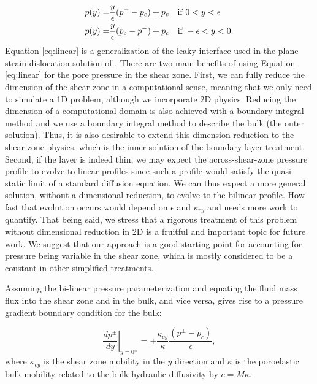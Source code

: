 \documentclass[draft]{agujournal2019}
\begin{document}
\begin{align}
    p(y) = & \frac{y}{\epsilon}(p^+ - p_c) + p_c \text{\quad if } 0 < y < \epsilon \nonumber \\ 
    p(y) = & \frac{y}{\epsilon}(p_c - p^-) + p_c \text{\quad if } - \epsilon < y < 0 .
    \label{eq:linear}
\end{align}
Equation \ref{eq:linear} is a generalization of the leaky interface used in the plane strain dislocation solution of . There are two main benefits of using Equation \ref{eq:linear} for the pore pressure in the shear zone. First, we can fully reduce the dimension of the shear zone in a computational sense, meaning that we only need to simulate a 1D problem, although we incorporate 2D physics. Reducing the dimension of a computational domain is also achieved with a boundary integral method and we use a boundary integral method to describe the bulk (the outer solution). Thus, it is also desirable to extend this dimension reduction to the shear zone physics, which is the inner solution of the boundary layer treatment. Second, if the layer is indeed thin, we may expect the across-shear-zone pressure profile to evolve to linear profiles since such a profile would satisfy the quasi-static limit of a standard diffusion equation. We can thus expect a more general solution, without a dimensional reduction, to evolve to the bilinear profile. How fast that evolution occurs would depend on $\epsilon$ and $\kappa_{cy}$ and needs more work to quantify. That being said, we stress that a rigorous treatment of this problem without dimensional reduction in 2D is a fruitful and important topic for future work. We suggest that our approach is a good starting point for accounting for pressure being variable in the shear zone, which is mostly considered to be a constant in other simplified treatments.

Assuming the bi-linear pressure parameterization and equating the fluid mass flux into the shear zone and in the bulk, and vice versa, gives rise to a pressure gradient boundary condition for the bulk:

\begin{equation}
 \left. \frac{d p^\pm}{d y} \right|_{y = 0^\pm} = \pm \frac{\kappa_{cy}}{\kappa} \frac{(p^\pm - p_c)}{\epsilon},
 \label{eq:BC}
\end{equation}
where $\kappa_{cy}$ is the shear zone mobility in the $y$ direction and $\kappa$ is the poroelastic bulk mobility related to the bulk hydraulic diffusivity by $c = M\kappa$.
\end{document}
